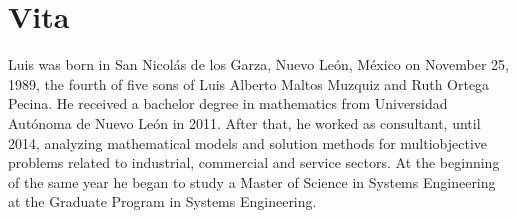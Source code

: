 \chapter{Vita}
Luis was born in San Nicol\'as de los Garza,
Nuevo Le\'on, M\'exico
on November 25, 1989,
the fourth of five sons of
Luis Alberto Maltos Muzquiz and Ruth Ortega Pecina.
He received a bachelor degree
in mathematics
from Universidad Aut\'onoma de Nuevo Le\'on in 2011.
After that,
he worked as consultant,
until 2014,
analyzing mathematical models
and solution methods
for multiobjective problems
related to industrial,
commercial and service sectors.
At the beginning of the same year
he began to study a Master of Science
in Systems Engineering
at the Graduate Program
in Systems Engineering.
